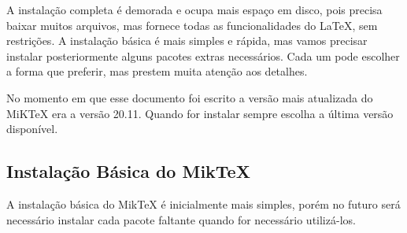 A instalação completa é demorada e ocupa mais espaço em disco, pois precisa baixar muitos arquivos, mas fornece todas as funcionalidades do \LaTeX, sem restrições. A instalação básica é mais simples e rápida, mas vamos precisar instalar posteriormente alguns pacotes extras necessários. Cada um pode escolher a forma que preferir, mas prestem muita atenção aos detalhes.

No momento em que esse documento foi escrito a versão mais atualizada do MiKTeX era a versão 20.11. Quando for instalar sempre escolha a última versão disponível.

\subsection{Instalação Básica do MikTeX}

A instalação básica do MikTeX é inicialmente mais simples, porém no futuro será necessário instalar cada pacote faltante quando for necessário utilizá-los.

